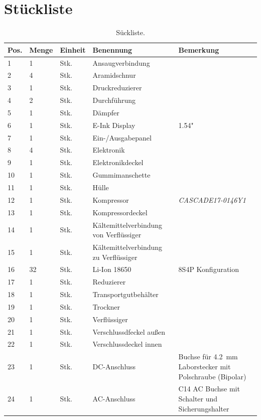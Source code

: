 	\section{Stückliste}
		\begin{table}[h]
			\centering
			\caption[Stückliste]{Sückliste.}
			\begin{tabular}[c]{@{}p{.05\textwidth}p{}p{}p{.4\textwidth}p{}@{}}
				\toprule
				Pos. & Menge & Einheit & Benennung & Bemerkung\\
				\midrule
				1&1&Stk.&Ansaugverbindung& \\
				2&4&Stk.&Aramidschnur& \\
				3&1&Stk.&Druckreduzierer& \\
				4&2&Stk.&Durchführung&\\
				5&1&Stk.&Dämpfer&\\
				6&1&Stk.&E-Ink Display&1.54"\\
				7&1&Stk.&Ein-/Ausgabepanel& \\
				8&4&Stk.&Elektronik& \\
				9&1&Stk.&Elektronikdeckel& \\
				10&1&Stk.&Gummimanschette& \\
				11&1&Stk.&Hülle&\\
				12&1&Stk.&Kompressor&\textit{CASCADE17-0146Y1}\\
				13&1&Stk.&Kompressordeckel& \\
				14&1&Stk.&Kältemittelverbindung von Verflüssiger& \\
				15&1&Stk.&Kältemittelverbindung zu Verflüssiger& \\
				16&32&Stk.&Li-Ion 18650&8S4P Konfiguration\\
				17&1&Stk.&Reduzierer& \\
				18&1&Stk.&Transportgutbehälter&\\
				19&1&Stk.&Trockner&\\
				20&1&Stk.&Verflüssiger&\\
				21&1&Stk.&Verschlussdfeckel außen&\\
				22&1&Stk.&Verschlussdeckel innen&\\
				23&1&Stk.&DC-Anschluss&Buchse für \SI{4,2}{mm} Laborstecker mit Polschraube (Bipolar)\\
				24&1&Stk.&AC-Anschluss&C14 AC Buchse mit Schalter und Sicherungshalter\\
				\bottomrule
			\end{tabular}
			\label{tab:stueckliste}
		\end{table}